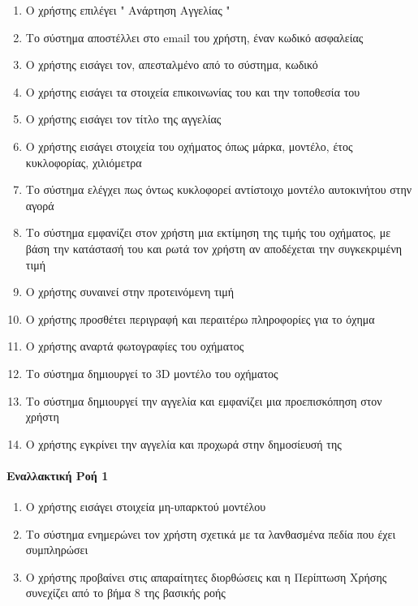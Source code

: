 \documentclass{../ol-softwaremanual}
\begin{document}
	\begin{enumerate}
		
		\item Ο χρήστης επιλέγει \en " \gr Ανάρτηση Αγγελίας \en " \gr 
		\item Το σύστημα αποστέλλει στο \en email \gr του χρήστη, έναν κωδικό ασφαλείας
		\item Ο χρήστης εισάγει τον, απεσταλμένο από το σύστημα, κωδικό
		\item Ο χρήστης εισάγει τα στοιχεία επικοινωνίας του και την τοποθεσία του
		\item Ο χρήστης εισάγει τον τίτλο της αγγελίας
		\item Ο χρήστης εισάγει στοιχεία του οχήματος όπως μάρκα, μοντέλο, έτος κυκλοφορίας, χιλιόμετρα
		\item Το σύστημα ελέγχει πως όντως κυκλοφορεί αντίστοιχο μοντέλο αυτοκινήτου στην αγορά
		\item Το σύστημα εμφανίζει στον χρήστη μια εκτίμηση της τιμής του οχήματος, με βάση την κατάστασή του και ρωτά τον χρήστη αν αποδέχεται την συγκεκριμένη τιμή
		\item Ο χρήστης συναινεί στην προτεινόμενη τιμή
		\item Ο χρήστης προσθέτει περιγραφή και περαιτέρω πληροφορίες για το όχημα
		\item Ο χρήστης αναρτά φωτογραφίες του οχήματος
		\item Το σύστημα δημιουργεί το \en 3D \gr μοντέλο του οχήματος
		\item Το σύστημα δημιουργεί την αγγελία και εμφανίζει μια προεπισκόπηση στον χρήστη
		\item Ο χρήστης εγκρίνει την αγγελία και προχωρά στην δημοσίευσή της		
	\end{enumerate}
	
	\paragraph{Εναλλακτική Ροή 1}
	
	\begin{enumerate}
		\item O χρήστης εισάγει στοιχεία μη-υπαρκτού μοντέλου
		\item Το σύστημα ενημερώνει τον χρήστη σχετικά με τα λανθασμένα πεδία που έχει συμπληρώσει
		\item Ο χρήστης προβαίνει στις απαραίτητες διορθώσεις και η Περίπτωση Χρήσης συνεχίζει από το βήμα 8 της βασικής ροής
	\end{enumerate}
\end{document}

